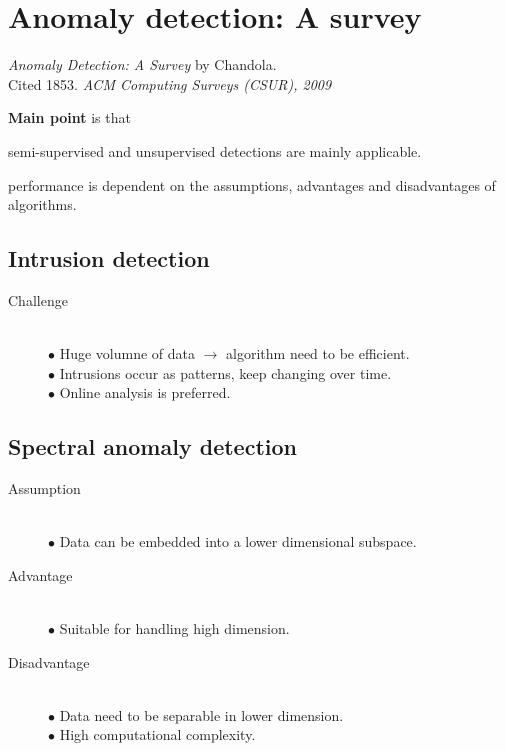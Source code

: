 \section{Anomaly detection: A survey}
\label{ch:chandola2009}

\textit{Anomaly Detection: A Survey} by Chandola. \\
Cited 1853. \textit{ACM Computing Surveys (CSUR), 2009}
\newline

\textbf{Main point} is that \begin{inparaenum}
\item semi-supervised and unsupervised detections are mainly applicable.
\item performance is dependent on the assumptions, advantages and disadvantages of algorithms.
\end{inparaenum}

\subsection{Intrusion detection}
\begin{description}
\item[Challenge] \hfill \\
$\bullet$ Huge volumne of data $\rightarrow$ algorithm need to be efficient. \\
$\bullet$ Intrusions occur as patterns, keep changing over time. \\
$\bullet$ Online analysis is preferred. \\
\end{description}

\subsection{Spectral anomaly detection}
\begin{description}
\item[Assumption] \hfill \\
$\bullet$ Data can be embedded into a lower dimensional subspace. \\

\item[Advantage] \hfill \\
$\bullet$ Suitable for handling high dimension. \\

\item[Disadvantage] \hfill \\
$\bullet$ Data need to be separable in lower dimension. \\
$\bullet$ High computational complexity. \\
\end{description}
